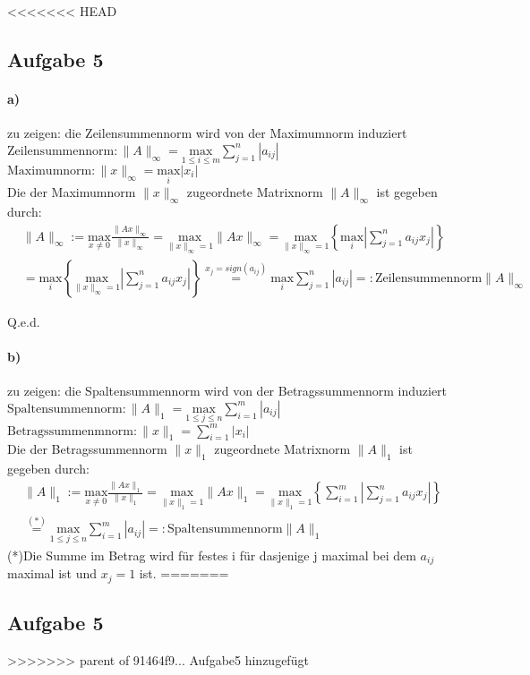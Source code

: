 <<<<<<< HEAD
\newpage
\subsection*{Aufgabe 5}
\paragraph*{a)}
zu zeigen: die Zeilensummennorm wird von der Maximumnorm induziert\\
\newline
$\mathrm{Zeilensummennorm: }\|A\|_\infty=\underset{1 \le i \le m}{\mathrm{max}} \sum_{j=1}^{n}|a_{ij}|$\\
\newline
$\mathrm{Maximumnorm: }\|x\|_\infty=\underset{i}{\mathrm{max}} |x_{i}|$\\
\newline
Die der Maximumnorm $\|x\|_\infty$ zugeordnete Matrixnorm $\|A\|_\infty$ ist gegeben durch:
\begin{align*}
&\|A\|_\infty := \underset{x\neq 0}{\mathrm{max}} \frac{\|Ax\|_\infty}{\|x\|_\infty} = 
\underset{\|x\|_\infty=1}{\mathrm{max}} \|Ax\|_\infty =
\underset{\|x\|_\infty=1}{\mathrm{max}}\left\lbrace \underset{i}{\mathrm{max}}\left|\sum_{j=1}^{n}a_{ij}x_j\right|\right\rbrace\\&=
\underset{i}{\mathrm{max}}\left\lbrace\underset{\|x\|_\infty=1}{\mathrm{max}}\left|\sum_{j=1}^{n} a_{ij}x_j\right|\right\rbrace
\overset{x_j=sign(a_{ij})}{=}\underset{i}{\mathrm{max}}\sum_{j=1}^{n}|a_{ij}|=: \mathrm{Zeilensummennorm} \|A\|_\infty
\end{align*}
\begin{flushright}Q.e.d.\end{flushright}

\paragraph*{b)}
zu zeigen: die Spaltensummennorm wird von der Betragssummennorm induziert\\
\newline
$\mathrm{Spaltensummennorm: }\|A\|_1=\underset{1 \le j \le n}{\mathrm{max}} \sum_{i=1}^{m}|a_{ij}|$\\
\newline
$\mathrm{Betragssummenmnorm: }\|x\|_1=\sum_{i=1}^{m}|x_i|$\\
\newline
Die der Betragssummennorm $\|x\|_1$ zugeordnete Matrixnorm $\|A\|_1$ ist gegeben durch:
\begin{align}
\|A\|_1 := \underset{x\neq 0}{\mathrm{max}} \frac{\|Ax\|_1}{\|x\|_1} = \underset{\|x\|_1=1}{\mathrm{max}} \|Ax\|_1 = \underset{\|x\|_1=1}{\mathrm{max}}\left\lbrace\sum_{i=1}^{m}\left|\sum_{j=1}^{n}a_{ij}x_j\right|\right\rbrace \\
\overset{(*)}{=} \underset{1 \le j \le n}{\mathrm{max}} \sum_{i=1}^{m}|a_{ij}| =: \mathrm{Spaltensummennorm} \|A\|_1
\end{align}
(*)Die Summe im Betrag wird f\"ur festes i f\"ur dasjenige j maximal bei dem $a_{ij}$ maximal ist und $x_j = 1$ ist.
=======
\subsection*{Aufgabe 5}
>>>>>>> parent of 91464f9... Aufgabe5 hinzugefügt
